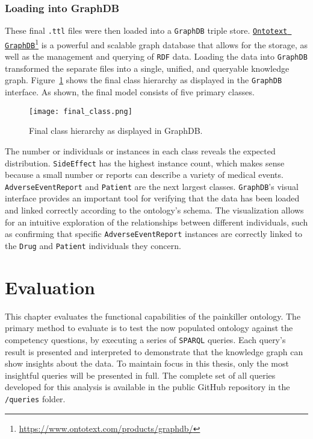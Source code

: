 \subsubsection*{Loading into GraphDB}
These final \texttt{.ttl} files were then loaded into a \texttt{GraphDB} triple store. \href{https://www.ontotext.com/products/graphdb/}{\texttt{Ontotext GraphDB}}\footnote{\url{https://www.ontotext.com/products/graphdb/}} is a powerful and scalable graph database that allows for the storage, as well as the management and querying of \texttt{RDF} data. Loading the data into \texttt{GraphDB} transformed the separate files into a single, unified, and queryable knowledge graph. Figure~\ref{fig:graphdb_hierarchy} shows the final class hierarchy as displayed in the \texttt{GraphDB} interface. As shown, the final model consists of five primary classes.

\begin{figure}[H]
\centering
\texttt{[image: final\_class.png]} %
\caption{Final class hierarchy as displayed in GraphDB.}
\label{fig:graphdb_hierarchy}
\end{figure}

The number or individuals or instances in each class reveals the expected distribution. \texttt{Side\-Effect} has the highest instance count, which makes sense because a small number or reports can describe a variety of medical events. \texttt{Adverse\-Event\-Report} and \texttt{Patient} are the next largest classes.
\texttt{GraphDB}'s visual interface provides an important tool for verifying that the data has been loaded and linked correctly according to the ontology's schema. The visualization allows for an intuitive exploration of the relationships between different individuals, such as confirming that specific \texttt{Adverse\-Event\-Report} instances are correctly linked to the \texttt{Drug} and \texttt{Patient} individuals they concern.

\section{Evaluation}

This chapter evaluates the functional capabilities of the painkiller ontology. The primary method to evaluate is to test the now populated ontology against the competency questions, by executing a series of \texttt{SPARQL} queries. Each query's result is presented and interpreted to demonstrate that the knowledge graph can show insights about the data. 
To maintain focus in this thesis, only the most insightful queries will be presented in full. The complete set of all queries developed for this analysis is available in the public GitHub repository in the \texttt{/queries} folder.

